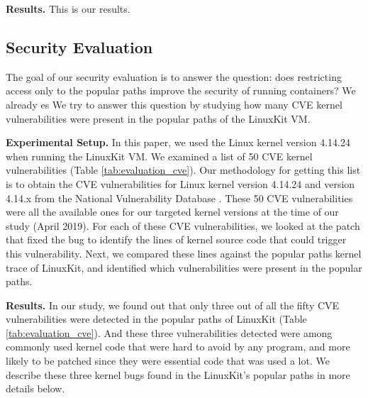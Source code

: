 \textbf{Results.}
This is our results.

\subsection{Security Evaluation}
\label{sec.evaluation.security} 
The goal of our security evaluation is to answer the question: does restricting access only to the popular paths improve the security of running containers? 
We already es
We try to answer this question by studying how many CVE kernel vulnerabilities were present in the popular paths of the LinuxKit VM. 

\textbf{Experimental Setup.}
In this paper, we used the Linux kernel version 4.14.24 when running the LinuxKit VM. 
We examined a list of 50 CVE kernel vulnerabilities (Table \ref{tab:evaluation_cve}). 
Our methodology for getting this list is to obtain the CVE vulnerabilities for Linux kernel version 4.14.24 and version 4.14.x from the National Vulnerability Database \cite{NVD}. 
These 50 CVE vulnerabilities were all the available ones for our targeted kernel versions at the time of our study (April 2019). 
For each of these CVE vulnerabilities, we looked at the patch that fixed the bug to identify the lines of kernel source code that could trigger this vulnerability. 
Next, we compared these lines against the popular paths kernel trace of LinuxKit, and identified which vulnerabilities were present in the popular paths. 

\textbf{Results.}
In our study, we found out that only three out of all the fifty CVE vulnerabilities were detected in the popular paths of LinuxKit (Table \ref{tab:evaluation_cve}). 
And these three vulnerabilities detected were among commonly used kernel code that were hard to avoid by any program, and more likely to be patched since they were essential code that was used a lot. 
We describe these three kernel bugs found in the LinuxKit's popular paths in more details below.  

